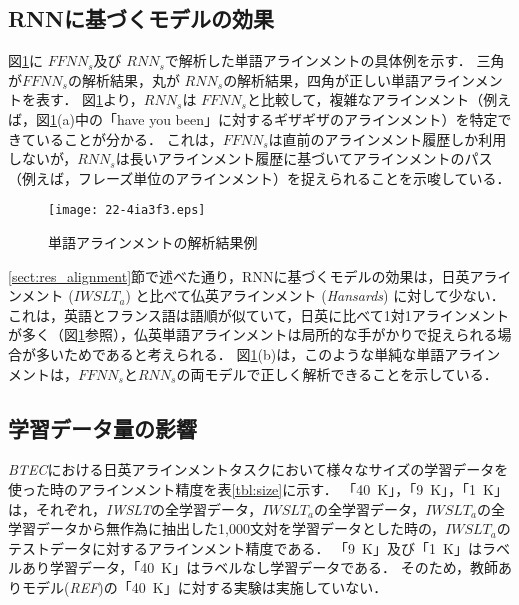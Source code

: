 \documentclass[japanese]{jnlp_1.4}
\begin{document}
\subsection{RNNに基づくモデルの効果}
\label{sect:discuss_RNN}

図\ref{fig:wa}に $\mathit{FFNN}_{s}$及び $\mathit{RNN}_{s}$で解析した単語アラインメントの具体例を示す．
三角が$\mathit{FFNN}_{s}$の解析結果，丸が $\mathit{RNN}_{s}$の解析結果，四角が正しい単語アラインメントを表す．
図\ref{fig:wa}より，$\mathit{RNN}_{s}$は $\mathit{FFNN}_{s}$と比較して，複雑なアラインメント（例えば，図\ref{fig:wa}(a)中の「have you been」に対するギザギザのアラインメント）を特定できていることが分かる．
これは，$\mathit{FFNN}_{s}$は直前のアラインメント履歴しか利用しないが，$\mathit{RNN}_{s}$は長いアラインメント履歴に基づいてアラインメントのパス（例えば，フレーズ単位のアラインメント）を捉えられることを示唆している．

\begin{figure}[b]
\begin{center}
\texttt{[image: 22-4ia3f3.eps]}
\end{center}
\caption{単語アラインメントの解析結果例}
\label{fig:wa}
\end{figure}

\ref{sect:res_alignment}節で述べた通り，RNNに基づくモデルの効果は，日英アラインメント ($\mathit{IWSLT}_{a}$) と比べて仏英アラインメント (\textit{Hansards}) に対して少ない．
これは，英語とフランス語は語順が似ていて，日英に比べて1対1アラインメントが多く（図\ref{fig:wa}参照），仏英単語アラインメントは局所的な手がかりで捉えられる場合が多いためであると考えられる．
図\ref{fig:wa}(b)は，このような単純な単語アラインメントは，$\mathit{FFNN}_{s}$と$\mathit{RNN}_{s}$の両モデルで正しく解析できることを示している．


\subsection{学習データ量の影響}
\label{sect:discuss_size}

{\it BTEC}における日英アラインメントタスクにおいて様々なサイズの学習データを使った時のアラインメント精度を表\ref{tbl:size}に示す．
「40~K」，「9~K」，「1~K」は，それぞれ，{\it IWSLT}の全学習データ，$\mathit{IWSLT}_{a}$の全学習データ，$\mathit{IWSLT}_{a}$の全学習データから無作為に抽出した1,000文対を学習データとした時の，$\mathit{IWSLT}_{a}$のテストデータに対するアラインメント精度である．
「9~K」及び「1~K」はラベルあり学習データ，「40~K」はラベルなし学習データである．
そのため，教師ありモデル({\it REF})の「40~K」に対する実験は実施していない．
\end{document}
